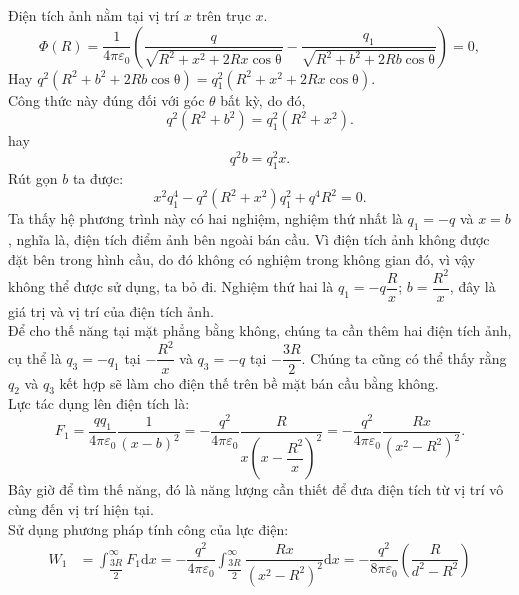 \begin{vd}
\begin{center}

\end{center}
\end{vd}
\begin{loigiai}
Điện tích ảnh nằm tại vị trí $x$ trên trục $x$.
\[\Phi(R)=\dfrac{1}{4\pi\varepsilon_0}\left(\dfrac{q}{\sqrt{R^2+x^2+2Rx\mathrm{\cos{\theta}}}}-\dfrac{q_1}{\sqrt{R^2+b^2+2Rb\mathrm{\cos{\theta}}}}\right)=0,\]
Hay $q^2(R^2+b^2+2Rb\mathrm{\cos{\theta}})=q_1^2(R^2+x^2+2Rx\mathrm{\cos{\theta}}).$\\
Công thức này đúng đối với góc $\theta$ bất kỳ, do đó,
\[q^2(R^2+b^2)=q_1^2(R^2+x^2). \tag{1} \label{cg.sang.2.3.1}\]
hay \[q^2b=q_1^2x. \tag{2} \label{cg.sang.2.3.2}\]
Rút gọn $b$ ta được:
\[x^2q_1^4-q^2(R^2+x^2)q_1^2+q^4R^2=0. \tag{3} \label{cg.sang.2.3.3}\]
Ta thấy hệ phương trình này có hai nghiệm, nghiệm thứ nhất là $q_1=-q$ và $x=b$, nghĩa là, điện tích điểm ảnh bên ngoài bán cầu. Vì điện tích ảnh không được đặt bên trong hình cầu, do đó không có nghiệm trong không gian đó, vì vậy không thể được sử dụng, ta bỏ đi. Nghiệm thứ hai là $q_1=-q\dfrac{R}{x}$; $b=\dfrac{R^2}{x}$, đây là giá trị và vị trí của điện tích ảnh. \\
Để cho thế năng tại mặt phẳng bằng không, chúng ta cần thêm hai điện tích ảnh, cụ thể là $q_3=-q_1$ tại $-\dfrac{R^2}{x}$ và $q_3=-q$ tại $-\dfrac{3R}{2}$. Chúng ta cũng có thể thấy rằng $q_2$ và $q_3$ kết hợp sẽ làm cho điện thế trên bề mặt bán cầu bằng không.\\
Lực tác dụng lên điện tích là:
\[F_1=\dfrac{qq_1}{4\pi\varepsilon_0}\dfrac{1}{(x-b)^2}=-\dfrac{q^2}{4\pi\varepsilon_0}\dfrac{R}{x\left(x-\dfrac{R^2}{x}\right)^2}=-\dfrac{q^2}{4\pi\varepsilon_0}\dfrac{Rx}{(x^2-R^2)^2}.\]
Bây giờ để tìm thế năng, đó là năng lượng cần thiết để đưa điện tích từ vị trí vô cùng đến vị trí hiện tại.\\
Sử dụng phương pháp tính công của lực điện:
\begin{align*}
    W_1&=\int_{\dfrac{3R}{2}}^{\infty}F_1\mathrm{d}x=-\dfrac{q^2}{4\pi\varepsilon_0}\int_{\dfrac{3R}{2}}^{\infty}\dfrac{Rx}{(x^2-R^2)^2}\mathrm{d}x=-\dfrac{q^2}{8\pi\varepsilon_0}\left(\dfrac{R}{d^2-R^2}\right)\\

\end{align*}
\end{loigiai}
